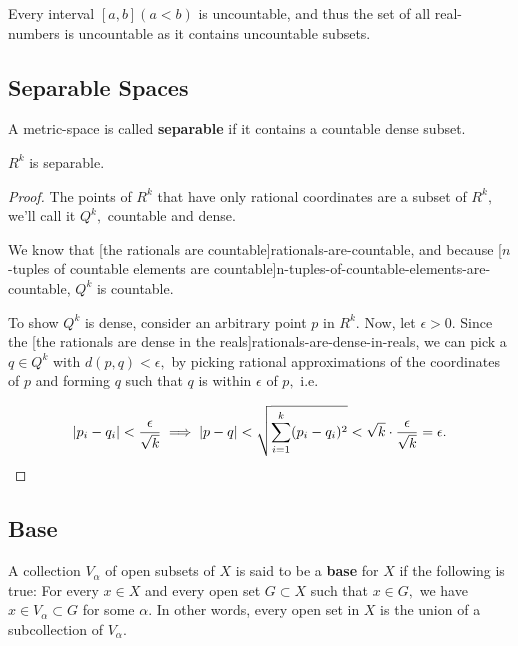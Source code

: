 \documentclass{article}
\begin{document}
\begin{corollary}\label{every-interval-is-uncountable}
Every \@{interval} $[a, b] (a < b)$ is \@{uncountable}, and thus the set of all \@{real-numbers} is uncountable as it contains uncountable subsets.
\end{corollary}

\subsection{Separable Spaces}

\begin{definition}[Separable]
A \@{metric-space} is called \textbf{separable} if it contains a \@{countable} \@{dense} subset.
\end{definition}

\begin{theorem}\label{euclidean-space-is-separable}
$R^k$ is \@{separable}.
\end{theorem}

\begin{proof}
The points of $R^k$ that have only rational coordinates are a \@{subset} of $R^k,$ we'll call it $Q^k,$ countable and dense.

We know that \@[the rationals are countable]{rationals-are-countable}, and because \@[$n$-tuples of countable elements are countable]{n-tuples-of-countable-elements-are-countable}, $Q^k$ is countable.

To show $Q^k$ is dense, consider an arbitrary point $p$ in $R^k.$ Now, let $\epsilon > 0.$ Since the \@[the rationals are dense in the reals]{rationals-are-dense-in-reals}, we can pick a $q \in Q^k$ with $d(p, q) < \epsilon,$ by picking rational approximations of the coordinates of $p$ and forming $q$ such that $q$ is within $\epsilon$ of $p,$ i.e.

\[ \left| p_i - q_i \right| < \frac{\epsilon}{\sqrt{k}} \implies \left| p - q \right| < \sqrt{\sum_{i=1}^k (p_i - q_i)^2 } < \sqrt{k} \cdot \frac{\epsilon}{\sqrt{k}} = \epsilon. \]
\end{proof}

\subsection{Base}

\begin{definition}[Base]
A \@{collection} ${V_\alpha}$ of \@{open} subsets of $X$ is said to be a \textbf{base} for $X$ if the following is true: For every $x \in X$ and every open set $G \subset X$ such that $x \in G,$ we have $x \in V_\alpha \subset G$ for some $\alpha.$ In other words, every open set in $X$ is the union of a subcollection of ${V_\alpha}.$
\end{definition}
\end{document}

